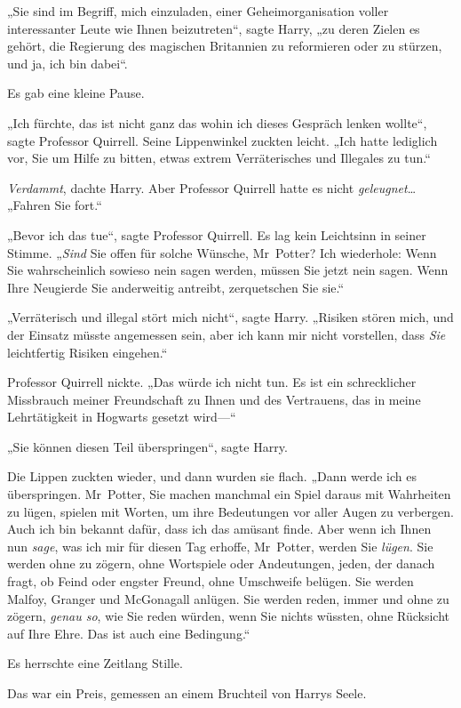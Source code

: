 {„Sie sind im Begriff, mich einzuladen, einer Geheimorganisation voller interessanter Leute wie Ihnen beizutreten“, sagte Harry, „zu deren Zielen es gehört, die Regierung des magischen Britannien zu reformieren oder zu stürzen, und ja, ich bin dabei“.

Es gab eine kleine Pause.

„Ich fürchte, das ist nicht ganz das wohin ich dieses Gespräch lenken wollte“, sagte Professor Quirrell. Seine Lippenwinkel zuckten leicht. „Ich hatte lediglich vor, Sie um Hilfe zu bitten, etwas extrem Verräterisches und Illegales zu tun.“

\emph{Verdammt}, dachte Harry. Aber Professor Quirrell hatte es nicht \emph{geleugnet}… „Fahren Sie fort.“

„Bevor ich das tue“, sagte Professor Quirrell. Es lag kein Leichtsinn in seiner Stimme. „\emph{Sind} Sie offen für solche Wünsche, Mr~Potter? Ich wiederhole: Wenn Sie wahrscheinlich sowieso nein sagen werden, müssen Sie jetzt nein sagen. Wenn Ihre Neugierde Sie anderweitig antreibt, zerquetschen Sie sie.“

„Verräterisch und illegal stört mich nicht“, sagte Harry. „Risiken stören mich, und der Einsatz müsste angemessen sein, aber ich kann mir nicht vorstellen, dass \emph{Sie} leichtfertig Risiken eingehen.“

Professor Quirrell nickte. „Das würde ich nicht tun. Es ist ein schrecklicher Missbrauch meiner Freundschaft zu Ihnen und des Vertrauens, das in meine Lehrtätigkeit in Hogwarts gesetzt wird—“

„Sie können diesen Teil überspringen“, sagte Harry.

Die Lippen zuckten wieder, und dann wurden sie flach. „Dann werde ich es überspringen. Mr~Potter, Sie machen manchmal ein Spiel daraus mit Wahrheiten zu lügen, spielen mit Worten, um ihre Bedeutungen vor aller Augen zu verbergen. Auch ich bin bekannt dafür, dass ich das amüsant finde. Aber wenn ich Ihnen nun \emph{sage}, was ich mir für diesen Tag erhoffe, Mr~Potter, werden Sie \emph{lügen}. Sie werden ohne zu zögern, ohne Wortspiele oder Andeutungen, jeden, der danach fragt, ob Feind oder engster Freund, ohne Umschweife belügen. Sie werden Malfoy, Granger und McGonagall anlügen. Sie werden reden, immer und ohne zu zögern, \emph{genau so}, wie Sie reden würden, wenn Sie nichts wüssten, ohne Rücksicht auf Ihre Ehre. Das ist auch eine Bedingung.“

Es herrschte eine Zeitlang Stille.

Das war ein Preis, gemessen an einem Bruchteil von Harrys Seele.

}
